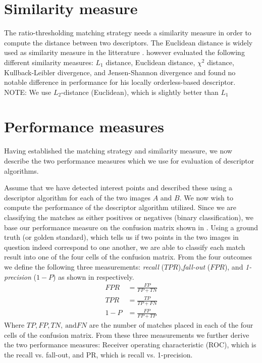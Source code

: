 \documentclass[thesis.tex]{subfiles}
\newcommand\TPR{\mathit{TPR}}
\newcommand\FPR{\mathit{FPR}}
\newcommand\OMP{\mathit{1-P}}
\newcommand\TP{\mathit{TP}}
\newcommand\FP{\mathit{FP}}
\newcommand\TN{\mathit{TN}}
\newcommand\FN{\mathit{FN}}
\newcommand\ROC{ROC}
\newcommand\PR{PR}
\begin{document}
\section{Similarity measure}
\label{sec:similarity_measure}
The ratio-thresholding matching strategy needs a similarity measure in order to compute the distance between two descriptors. The Euclidean distance is widely used as similarity measure in the litterature \cite{lowe2004distinctive,ke2004pca,mikolajczyk2005performance}. \citet{larsen2012in} however evaluated the following different similarity measures: $L_1$ distance, Euclidean distance, $\chi^2$ distance, Kullback-Leibler divergence, and Jensen-Shannon divergence and found no notable difference in performance for his locally orderless-based descriptor.
NOTE: We use $L_2$-distance (Euclidean), which is slightly better than $L_1$

\section{Performance measures}
\label{sec:performance_measures}

Having established the matching strategy and similarity measure, we now describe the two performance measures which we use for evaluation of descriptor algorithms.

Assume that we have detected interest points and described these using a descriptor algorithm for each of the two images $A$ and $B$. We now wish to compute the performance of the descriptor algorithm utilized.
 Since we are classifying the matches as either positives or negatives (binary classification), we base our performance measure on the confusion matrix shown in . Using a ground truth (or golden standard), which tells us if two points in the two images in question indeed correspond to one another, we are able to classify each match result into one of the four cells of the confusion matrix. From the four outcomes we define the following three measurements: \emph{recall} ($\TPR$),\emph{fall-out} ($\FPR$), and \emph{1-precision} ($\OMP$) as shown in  respectively.
\begin{align}
	\label{eq:fpr}
	\FPR &= \frac{\FP}{\FP + \TN} \\
	\label{eq:tpr}
	\TPR &= \frac{\TP}{\TP + \FN} \\
	\label{eq:omp}
	\OMP &= \frac{\FP}{\FP + \TP}
\end{align}
Where $\TP,\FP,\TN,~\text{and} \FN$ are the number of matches placed in each of the four cells of the confusion matrix.
From these three measurements we further derive the two performance measures: Receiver operating characteristic (\ROC), which is the recall vs. fall-out, and \PR {}, which is recall vs. 1-precision.
\end{document}
